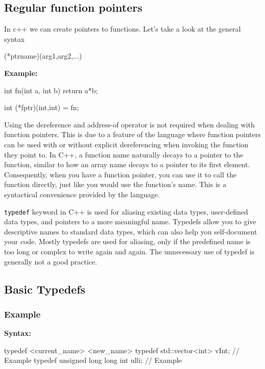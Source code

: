 \documentclass{report}
\begin{document}
    \subsection{Regular function pointers}
    In c++ we can create pointers to functions. Let's take a look at the general syntax
    \bigbreak \noindent 
    \begin{cppcode}
         (*ptrname)(arg1,arg2,...)
    \end{cppcode}
    \bigbreak \noindent 
    \textbf{Example:}
    \bigbreak \noindent 
    \begin{cppcode}
        int fn(int a, int b) {
            return a*b;
        }

        int (*fptr)(int,int) = fn;
    \end{cppcode}
    \bigbreak \noindent 
    \begin{notebox}
       Using the dereference and address-of operator is not required when dealing with function pointers. This is due to a feature of the language where function pointers can be used with or without explicit dereferencing when invoking the function they point to. 
       \bigbreak \noindent 
       In C++, a function name naturally decays to a pointer to the function, similar to how an array name decays to a pointer to its first element. Consequently, when you have a function pointer, you can use it to call the function directly, just like you would use the function's name. This is a syntactical convenience provided by the language.
    \end{notebox}
    


    \pagebreak 
    \bigbreak \noindent 
    \begin{concept}
        \texttt{typedef} keyword in C++ is used for aliasing existing data types, user-defined data types, and pointers to a more meaningful name. Typedefs allow you to give descriptive names to standard data types, which can also help you self-document your code. Mostly typedefs are used for aliasing, only if the predefined name is too long or complex to write again and again.  The unnecessary use of typedef is generally not a good practice.
    \end{concept}
    \bigbreak \noindent 
    \subsection{Basic Typedefs}
    \bigbreak \noindent 
    \subsubsection{Example}
    \bigbreak \noindent 
    \textbf{Syntax:}
    \bigbreak \noindent 
    \begin{cppcode}
    typedef <current_name> <new_name>
    typedef std::vector<int> vInt; // Example
    typedef unsigned long long int ulli;  // Example
    \end{cppcode}
    \bigbreak \noindent 
\end{document}
